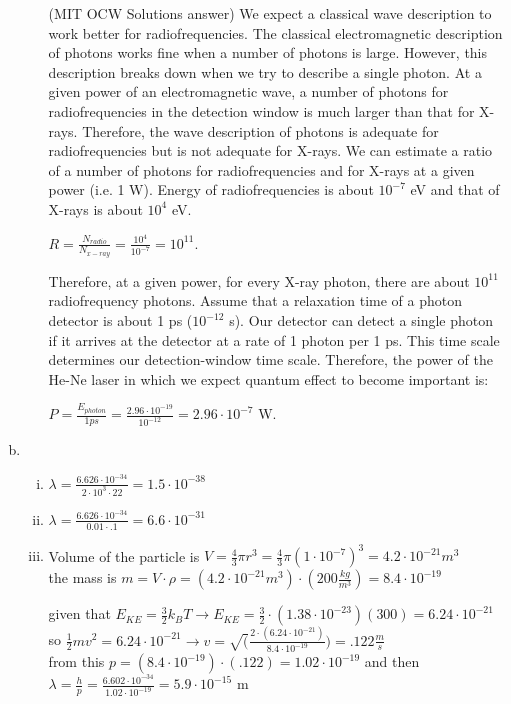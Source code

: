 \documentclass[ps1.tex]{subfiles}
\begin{document}
\begin{enumerate}[(a)]
\begin{enumerate}[i.]
(MIT OCW Solutions answer)
We expect a classical wave description to work better for radiofrequencies. The classical electromagnetic description of photons works fine when a number of photons is large. However, this description breaks down when we try to describe a single photon. At a given power of an electromagnetic wave, a number of photons for radiofrequencies in the detection window is much larger than that for X-rays. Therefore, the wave description of photons is adequate for radiofrequencies but is not adequate for X-rays. We can estimate a ratio of a number of photons for radiofrequencies and for X-rays at a given power (i.e. 1 W). Energy of radiofrequencies is about $10^{-7}$ eV and that of X-rays is about $10^4$ eV.

$R = \frac {N_{radio}}{N_{x-ray}} = \frac {10^4}{10^{-7}} = 10^{11}$.

Therefore, at a given power, for every X-ray photon, there are about $10^{11}$ radiofrequency photons.
Assume that a relaxation time of a photon detector is about 1 ps ($10^{-12}$ s). Our detector can detect a single photon if it arrives at the detector at a rate of 1 photon per 1 ps. This time scale determines our detection-window time scale. Therefore, the power of the He-Ne laser in which we expect quantum effect to become important is:

$P = \frac {E_{photon}}{1 ps} = \frac {2.96\cdot10^{-19}}{10^{-12}} = 2.96\cdot10^{-7}$ W.

\end{enumerate}

\noindent\makebox[\linewidth]{\rule{\paperwidth}{0.4pt}}


\item  \mbox{} \\ 
\noindent
\begin{enumerate}[i.]
\item $\lambda = \frac {6.626\cdot10^{-34}}{2\cdot10^3\cdot 22} = 1.5\cdot10^{-38}$

\item $\lambda = \frac {6.626\cdot10^{-34}}{0.01\cdot .1} = 6.6\cdot10^{-31}$

\item Volume of the particle is $V=\frac {4}{3}\pi r^3 = \frac {4}{3}\pi(1\cdot10^{-7})^3 = 4.2\cdot10^{-21}m^3$\\
the mass is $m=V\cdot \rho = (4.2\cdot 10^{-21}m^3)\cdot (200 \frac {kg}{m^3}) = 8.4\cdot10^{-19}$

given that $E_{KE} = \frac {3}{2}k_BT \rightarrow E_{KE} = \frac {3}{2}\cdot(1.38\cdot10^{-23})(300) = 6.24\cdot10^{-21}$
so $\frac{1}{2}mv^2 =  6.24\cdot10^{-21} \rightarrow v = \sqrt(\frac {2\cdot(6.24\cdot10^{-21})}{8.4\cdot10^{-19}}) = .122 \frac {m}{s}$\\
from this $p = (8.4\cdot10^{-19})\cdot(.122) = 1.02\cdot10^{-19}$ and then $\lambda = \frac {h}{p} = \frac {6.602\cdot10^{-34}}{1.02\cdot10^{-19}} = 5.9\cdot10^{-15}$ m\\


\end{enumerate}
\end{enumerate}
\end{document}
